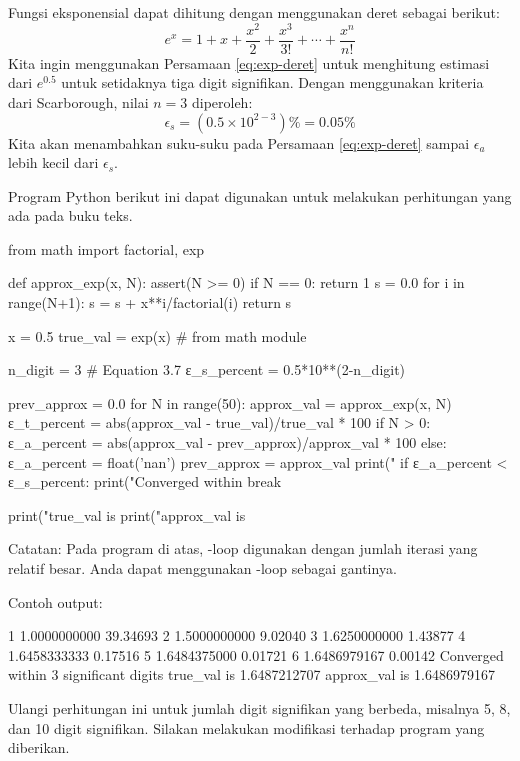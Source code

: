 Fungsi eksponensial dapat dihitung dengan menggunakan deret sebagai berikut:
\begin{equation}
e^{x} = 1 + x + \frac{x^2}{2} + \frac{x^3}{3!} + \cdots + \frac{x^n}{n!}
\label{eq:exp-deret}
\end{equation}
Kita ingin menggunakan Persamaan \eqref{eq:exp-deret} untuk menghitung estimasi
dari $e^{0.5}$ untuk setidaknya tiga digit signifikan.
Dengan menggunakan kriteria dari Scarborough, nilai $n=3$ diperoleh:
\begin{equation*}
\epsilon_{s} = (0.5 \times 10^{2-3}) \% = 0.05 \%
\end{equation*}
Kita akan menambahkan suku-suku pada Persamaan \eqref{eq:exp-deret} sampai $\epsilon_{a}$
lebih kecil dari $\epsilon_{s}$.

Program Python berikut ini dapat digunakan untuk melakukan perhitungan yang ada pada buku teks.
\begin{pythoncode}
from math import factorial, exp

def approx_exp(x, N):
    assert(N >= 0)
    if N == 0:
        return 1
    s = 0.0
    for i in range(N+1):
        s = s + x**i/factorial(i)
    return s
  
x = 0.5
true_val = exp(x) # from math module
  
n_digit = 3
# Equation 3.7
ε_s_percent = 0.5*10**(2-n_digit)
  
prev_approx = 0.0
for N in range(50):
    approx_val = approx_exp(x, N)
    ε_t_percent = abs(approx_val - true_val)/true_val * 100
    if N > 0:
        ε_a_percent = abs(approx_val - prev_approx)/approx_val * 100
    else:
        ε_a_percent = float('nan')
    prev_approx = approx_val
    print("%
    if ε_a_percent < ε_s_percent:
        print("Converged within %
        break

print("true_val   is %
print("approx_val is %
\end{pythoncode}

Catatan: Pada program di atas, -loop digunakan dengan jumlah iterasi yang relatif
besar. Anda dapat menggunakan -loop sebagai gantinya.

Contoh output:
\begin{textcode}
  1       1.0000000000   39.34693%
  2       1.5000000000    9.02040%
  3       1.6250000000    1.43877%
  4       1.6458333333    0.17516%
  5       1.6484375000    0.01721%
  6       1.6486979167    0.00142%
Converged within 3 significant digits
true_val   is       1.6487212707
approx_val is       1.6486979167
\end{textcode}


\begin{soal}
Ulangi perhitungan ini untuk jumlah digit signifikan yang berbeda, misalnya 5, 8, dan 10
digit signifikan. Silakan melakukan modifikasi terhadap program yang diberikan.
\end{soal}